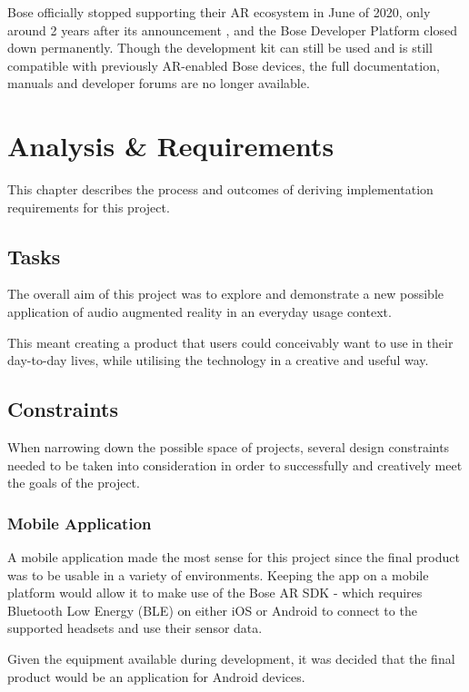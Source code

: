 \documentclass{l4proj}
\begin{document}
Bose officially stopped supporting their AR ecosystem in June of 2020, only around 2 years after its announcement \citep{roettgers_another_2020}, and the Bose Developer Platform closed down permanently. Though the development kit can still be used and is still compatible with previously AR-enabled Bose devices, the full documentation, manuals and developer forums are no longer available.

\chapter{Analysis \& Requirements}
This chapter describes the process and outcomes of deriving implementation requirements for this project.

\section{Tasks}
The overall aim of this project was to explore and demonstrate a new possible application of audio augmented reality in an everyday usage context.

This meant creating a product that users could conceivably want to use in their day-to-day lives, while utilising the technology in a creative and useful way. 

\section{Constraints}
When narrowing down the possible space of projects, several design constraints needed to be taken into consideration in order to successfully and creatively meet the goals of the project.

\subsection{Mobile Application}
A mobile application made the most sense for this project since the final product was to be usable in a variety of environments. Keeping the app on a mobile platform would allow it to make use of the Bose AR SDK - which requires Bluetooth Low Energy (BLE) on either iOS or Android to connect to the supported headsets and use their sensor data. 

Given the equipment available during development, it was decided that the final product would be an application for Android devices.
\end{document}
